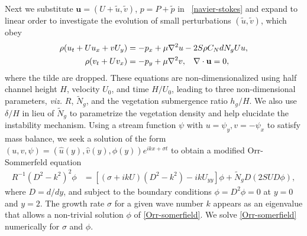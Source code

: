 \documentclass{jfm}
\newcommand{\bu}{\mathbf{u}}
\newcommand{\hg}{h_g}
\renewcommand{\Rey}{{R}}
\newcommand{\Ndg}{\tilde{N}_g}
\begin{document}
Next we substitute $\bu = (U+\tilde{u}, \tilde{v})$, $p=P+\tilde{p}$ in ~\eqref{navier-stokes} and expand to linear order to investigate the evolution of small perturbations $(\tilde{u}, \tilde{v})$, which obey
\begin{equation}
\begin{split}
\rho(u_t+U u_x+vU_y) &= -p_x+ {\mu}\nabla^2u-2S\rho C_{N}dN_{g}Uu, \\
\rho(v_t+ Uv_x) &= -p_y+ {\mu}\nabla^2v, \hspace{0.3cm} \nabla\cdot\bu=0,
\end{split} \nonumber
\end{equation}
where the tilde are dropped.
These equations are non-dimensionalized using half channel height $H$, velocity $U_0$, and time $H/U_0$, leading to three non-dimensional parameters, \textit{viz.} $\Rey$, $\Ndg$, and the vegetation submergence ratio $\hg/H$. 
We also use $\delta/H$ in lieu of $\Ndg$ to parametrize the vegetation density and help elucidate the instability mechanism. 
Using a stream function $\psi$ with $u = \psi_{y}, v= -\psi_x$ to satisfy mass balance, we seek a solution of 
the form $\left(u,v,\psi \right)= \left(\hat u(y), \hat v(y), \phi(y) \right)e^{ikx+\sigma t}$ to obtain a modified Orr-Sommerfeld equation \citep{Drazin81,Chen97,Chu91} 
\begin{equation}
\begin{split}
\Rey^{-1}\left(D^2 -k^{2} \right)^2\phi &= \left[ \left({\sigma}+ikU\right) \left(D^2-k^2\right) -ikU_{yy}\right]\phi + \Ndg D\left(2 S U D \phi\right),
\label{Orr-somerfield}
\end{split}
\end{equation}
where $D=d/dy$, and subject to the boundary conditions $\phi = D^2\phi = 0$ at $y=0$ and $y=2$. 
The growth rate $\sigma$ for a given wave number $k$ appears as an eigenvalue that allows a non-trivial solution $\phi$ of  \eqref{Orr-somerfield}.
We solve \eqref{Orr-somerfield} numerically for $\sigma$ and $\phi$.
\end{document}
